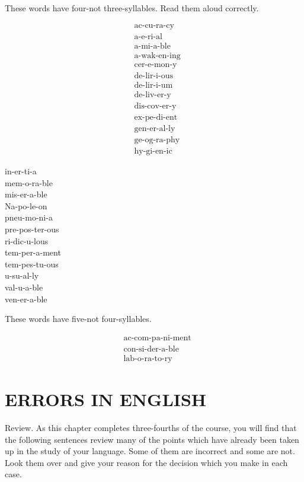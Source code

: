 \documentclass[10pt]{article}
\begin{document}
These words have four-not three-syllables. Read them aloud correctly.

$$
\begin{aligned}
& \text { ac-cu-ra-cy } \\
& \text { a-e-ri-al } \\
& \text { a-mi-a-ble } \\
& \text { a-wak-en-ing } \\
& \text { cer-e-mon-y } \\
& \text { de-lir-i-ous } \\
& \text { de-lir-i-um } \\
& \text { de-liv-er-y } \\
& \text { dis-cov-er-y } \\
& \text { ex-pe-di-ent } \\
& \text { gen-er-al-ly } \\
& \text { ge-og-ra-phy } \\
& \text { hy-gi-en-ic }
\end{aligned}
$$

in-er-ti-a\\
mem-o-ra-ble\\
mis-er-a-ble\\
Na-po-le-on\\
pneu-mo-ni-a\\
pre-pos-ter-ous\\
ri-dic-u-lous\\
tem-per-a-ment\\
tem-pes-tu-ous\\
u-su-al-ly\\
val-u-a-ble\\
ven-er-a-ble

These words have five-not four-syllables.

$$
\begin{aligned}
& \text { ac-com-pa-ni-ment } \\
& \text { con-si-der-a-ble } \\
& \text { lab-o-ra-to-ry }
\end{aligned}
$$

\section*{ERRORS IN ENGLISH}
Review. As this chapter completes three-fourths of the course, you will find that the following sentences review many of the points which have already been taken up in the study of your language. Some of them are incorrect and some are not. Look them over and give your reason for the decision which you make in each case.
\end{document}

